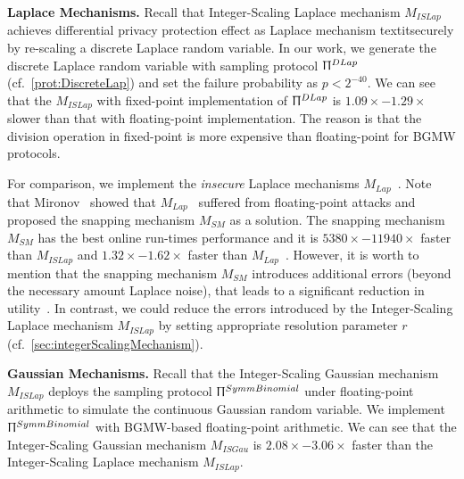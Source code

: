 \textbf{Laplace Mechanisms.}
Recall that Integer-Scaling Laplace mechanism $M_{ISLap} $ achieves differential privacy protection effect as Laplace mechanism textit{securely} by re-scaling a discrete Laplace random variable.
In our work, we generate the discrete Laplace random variable with sampling protocol $\Uppi^{DLap}$ (cf.~\autoref{prot:DiscreteLap}) and set the failure probability as $p<2^{-40}$.
We can see that the $M_{ISLap}$ with fixed-point implementation of $\Uppi^{DLap}$ is $1.09\times-1.29\times$ slower than that with floating-point implementation.
The reason is that the division operation in fixed-point is more expensive than floating-point for BGMW protocols.

For comparison, we implement the \textit{insecure} Laplace mechanisms $M_{Lap}$~\cite{eigner2014differentially}.
Note that Mironov~\cite{mironov2012significance} showed that $M_{Lap}$~\cite{eigner2014differentially} suffered from floating-point attacks and proposed the snapping mechanism $M_{SM}$ as a solution.
The snapping mechanism $M_{SM}$ has the best online run-times performance and it is $5380\times-11940\times $ faster than $M_{ISLap}$ and $1.32\times- 1.62\times$ faster than $M_{Lap}$~\cite{eigner2014differentially}.
However, it is worth to mention that the snapping mechanism $M_{SM}$ introduces additional errors (beyond the necessary amount Laplace noise), that leads to a significant reduction in utility~\cite{Covington2019,googleDP2019}.
In contrast, we could reduce the errors introduced by the Integer-Scaling Laplace mechanism $M_{ISLap}$ by setting appropriate resolution parameter $r$ (cf.~\autoref{sec:integerScalingMechanism}).







\textbf{Gaussian Mechanisms.}
Recall that the Integer-Scaling Gaussian mechanism $M_{ISLap}$ deploys the sampling protocol $\Uppi^{SymmBinomial}$ under floating-point arithmetic to simulate the continuous Gaussian random variable.
We implement $\Uppi^{SymmBinomial}$ with BGMW-based floating-point arithmetic.
We can see that the Integer-Scaling Gaussian mechanism $M_{ISGau}$ is $2.08\times-3.06\times$ faster than the Integer-Scaling Laplace mechanism $M_{ISLap}$.


